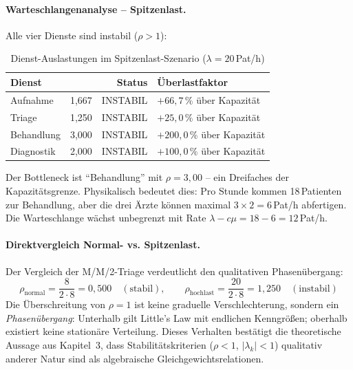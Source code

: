﻿\documentclass[a4paper,12pt]{scrreprt}
\theoremstyle{definition}
\begin{document}
\paragraph{Warteschlangenanalyse -- Spitzenlast.}
Alle vier Dienste sind instabil ($\rho > 1$):

\begin{table}[H]
	\centering
	\begin{tabular}{@{}lrrl@{}}
		\toprule
		\textbf{Dienst} & \boldmath{$\rho$} & \textbf{Status} & \textbf{Überlastfaktor} \\
		\midrule
		Aufnahme   & 1{,}667 & INSTABIL & $+66{,}7\,\%$ über Kapazität \\
		Triage     & 1{,}250 & INSTABIL & $+25{,}0\,\%$ über Kapazität \\
		Behandlung & 3{,}000 & INSTABIL & $+200{,}0\,\%$ über Kapazität \\
		Diagnostik & 2{,}000 & INSTABIL & $+100{,}0\,\%$ über Kapazität \\
		\bottomrule
	\end{tabular}
	\caption{Dienst-Auslastungen im Spitzenlast-Szenario ($\lambda = 20$\,Pat/h)}
	\label{tab:auslastung-hochlast}
\end{table}

Der Bottleneck ist ``Behandlung'' mit $\rho = 3{,}00$ -- ein Dreifaches
der Kapazitätsgrenze. Physikalisch bedeutet dies: Pro Stunde kommen
18\,Patienten zur Behandlung, aber die drei Ärzte können maximal
$3 \times 2 = 6$\,Pat/h abfertigen. Die Warteschlange wächst
unbegrenzt mit Rate $\lambda - c\mu = 18 - 6 = 12$\,Pat/h.

\paragraph{Direktvergleich Normal- vs. Spitzenlast.}
Der Vergleich der M/M/2-Triage verdeutlicht den qualitativen Phasenübergang:
\begin{equation}
	\rho_\text{normal} = \frac{8}{2 \cdot 8} = 0{,}500 \quad (\text{stabil}),
	\qquad
	\rho_\text{hochlast} = \frac{20}{2 \cdot 8} = 1{,}250 \quad (\text{instabil})
\end{equation}
Die Überschreitung von $\rho = 1$ ist keine graduelle Verschlechterung,
sondern ein \emph{Phasenübergang}: Unterhalb gilt Little's Law
mit endlichen Kenngrößen; oberhalb existiert keine stationäre Verteilung.
Dieses Verhalten bestätigt die theoretische Aussage aus Kapitel~3, dass
Stabilitätskriterien ($\rho < 1$, $|\lambda_k| < 1$) qualitativ anderer
Natur sind als algebraische Gleichgewichtsrelationen.
\end{document}
